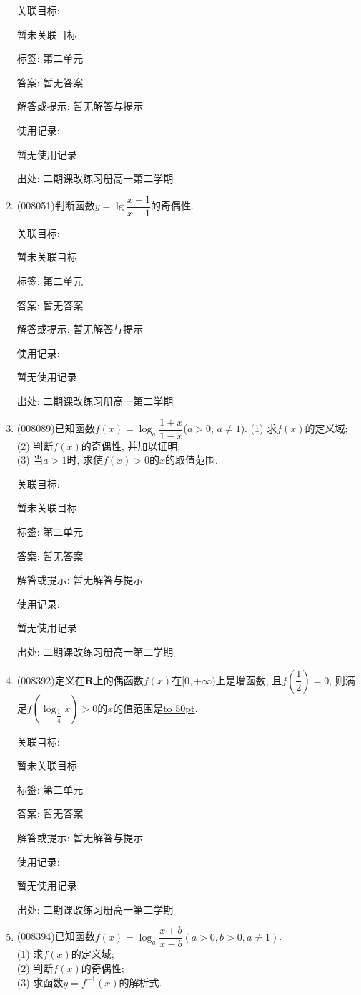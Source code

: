\documentclass[10pt,a4paper]{article}
\newcommand{\blank}[1]{\underline{\hbox to #1pt{}}}
\begin{document}
\begin{enumerate}[1.]
关联目标:

暂未关联目标



标签: 第二单元

答案: 暂无答案

解答或提示: 暂无解答与提示

使用记录:

暂无使用记录


出处: 二期课改练习册高一第二学期
\item { (008051)}判断函数$y=\lg\dfrac{x+1}{x-1}$的奇偶性.


关联目标:

暂未关联目标



标签: 第二单元

答案: 暂无答案

解答或提示: 暂无解答与提示

使用记录:

暂无使用记录


出处: 二期课改练习册高一第二学期
\item { (008089)}已知函数$f(x)=\log _a\dfrac{1+x}{1-x}$($a>0$, $a\ne 1$).
(1) 求$f(x)$的定义域;\\
(2) 判断$f(x)$的奇偶性, 并加以证明;\\
(3) 当$a>1$时, 求使$f(x)>0$的$x$的取值范围.


关联目标:

暂未关联目标



标签: 第二单元

答案: 暂无答案

解答或提示: 暂无解答与提示

使用记录:

暂无使用记录


出处: 二期课改练习册高一第二学期
\item { (008392)}定义在$\mathbf{R}$上的偶函数$f(x)$在$[0,+\infty)$上是增函数, 且$f(\dfrac 12)=0$, 则满足$f(\log _{\dfrac 14}x)>0$的$x$的值范围是\blank{50}.


关联目标:

暂未关联目标



标签: 第二单元

答案: 暂无答案

解答或提示: 暂无解答与提示

使用记录:

暂无使用记录


出处: 二期课改练习册高一第二学期
\item { (008394)}已知函数$f(x)=\log _a\dfrac{x+b}{x-b}(a>0,b>0, a\ne 1)$.\\
(1) 求$f(x)$的定义域;\\
(2) 判断$f(x)$的奇偶性;\\
(3) 求函数$y=f^{-1}(x)$的解析式.



\end{enumerate}
\end{document}
